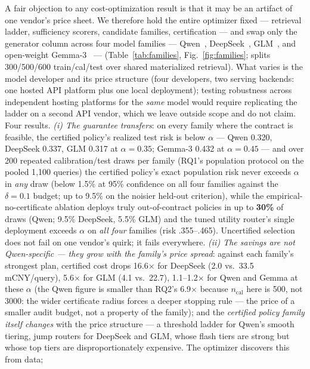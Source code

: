A fair objection to any cost-optimization result is that it may be an
artifact of one vendor's price sheet. We therefore hold the entire
optimizer fixed --- retrieval ladder, sufficiency scorers, candidate
families, certification --- and swap only the generator column across
four model families ---
Qwen~\cite{qwen25}, DeepSeek~\cite{deepseekv3,deepseekr1},
GLM~\cite{glm2024}, and open-weight Gemma-3~\cite{gemma3} ---
(Table~\ref{tab:families},
Fig.~\ref{fig:families}; splits 300/500/600
train/cal/test over shared materialized retrieval). What varies is the
model developer and its price structure (four developers, two serving
backends: one hosted API platform plus one local deployment); testing
robustness across independent hosting platforms for the \emph{same}
model would require replicating the ladder on a second API vendor,
which we leave outside scope and do not claim. Four results.
\emph{(i) The guarantee transfers}: on every family where the contract
is feasible, the certified policy's realized test risk is below
$\alpha$ --- Qwen 0.320, DeepSeek 0.337, GLM 0.317 at $\alpha{=}0.35$;
Gemma-3 0.432 at $\alpha{=}0.45$ --- and over 200 repeated
calibration/test draws per family (RQ1's population protocol on the
pooled 1{,}100 queries) the certified policy's exact population risk
never exceeds $\alpha$ in \emph{any} draw (below 1.5\% at 95\%
confidence on all four families
against the $\delta{=}0.1$ budget; up to 9.5\% on the noisier held-out
criterion), while the
empirical-no-certificate ablation deploys truly out-of-contract
policies in up to \textbf{30\%} of
draws (Qwen; 9.5\% DeepSeek, 5.5\% GLM) and the tuned utility router's
single deployment exceeds $\alpha$ on \emph{all four} families
(risk .355--.465). Uncertified selection does not fail on one vendor's
quirk; it fails everywhere.
\emph{(ii) The savings are not
Qwen-specific --- they grow with the family's price spread}: against
each family's strongest plan, certified cost drops 16.6$\times$ for
DeepSeek (2.0 vs.\ 33.5 mCNY/query), 5.6$\times$ for GLM (4.1 vs.\
22.7), 1.1--1.2$\times$ for Qwen and Gemma at these $\alpha$ (the Qwen
figure is smaller than RQ2's 6.9$\times$ because $n_{\mathrm{cal}}$
here is 500, not 3000: the wider certificate radius forces a deeper
stopping rule --- the price of a smaller audit budget, not a property
of the family); and the
\emph{certified policy family itself changes} with the price structure
--- a threshold ladder for Qwen's smooth tiering, jump routers for
DeepSeek and GLM, whose flash tiers are strong but whose top tiers are
disproportionately expensive. The optimizer discovers this from data;
